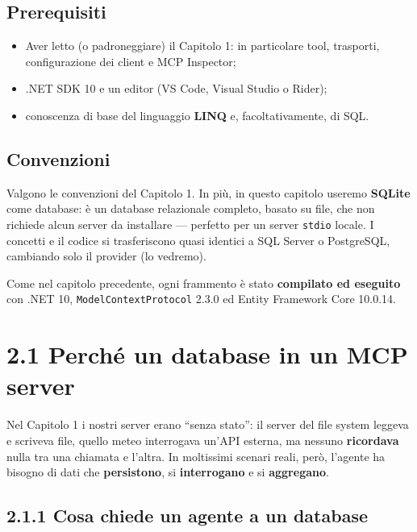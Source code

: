 \documentclass[
  italian,
  10pt,
]{book}
\providecommand{\tightlist}{%
  \setlength{\itemsep}{0pt}\setlength{\parskip}{0pt}}
\begin{document}
\subsection{Prerequisiti}\label{prerequisiti-1}

\begin{itemize}
\tightlist
\item
  Aver letto (o padroneggiare) il Capitolo 1: in particolare tool,
  trasporti, configurazione dei client e MCP Inspector;
\item
  .NET SDK 10 e un editor (VS Code, Visual Studio o Rider);
\item
  conoscenza di base del linguaggio \textbf{LINQ} e, facoltativamente,
  di SQL.
\end{itemize}

\subsection{Convenzioni}\label{convenzioni}

Valgono le convenzioni del Capitolo 1. In più, in questo capitolo
useremo \textbf{SQLite} come database: è un database relazionale
completo, basato su file, che non richiede alcun server da installare
--- perfetto per un server \texttt{stdio} locale. I concetti e il codice
si trasferiscono quasi identici a SQL Server o PostgreSQL, cambiando
solo il provider (lo vedremo).

Come nel capitolo precedente, ogni frammento è stato \textbf{compilato
ed eseguito} con .NET 10, \texttt{ModelContextProtocol} 2.3.0 ed Entity
Framework Core 10.0.14.

\section{2.1 Perché un database in un MCP
server}\label{perchuxe9-un-database-in-un-mcp-server}

Nel Capitolo 1 i nostri server erano ``senza stato'': il server del file
system leggeva e scriveva file, quello meteo interrogava un'API esterna,
ma nessuno \textbf{ricordava} nulla tra una chiamata e l'altra. In
moltissimi scenari reali, però, l'agente ha bisogno di dati che
\textbf{persistono}, si \textbf{interrogano} e si \textbf{aggregano}.

\subsection{2.1.1 Cosa chiede un agente a un
database}\label{cosa-chiede-un-agente-a-un-database}
\end{document}
